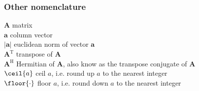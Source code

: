\subsubsection*{Other nomenclature}


$\bm{A}$ \mytab matrix\\

$\bm{a}$ \mytab column vector\\

$|\bm{a}|$ \mytab euclidean norm of vector $\bm{a}$\\

$\bm{A}^\text{T}$ \mytab transpose of $\bm{A}$\\
$\bm{A}^\text{H}$ \mytab Hermitian of $\bm{A}$, also know as the transpose conjugate of $\bm{A}$\\

$\ceil{a}$ \mytab ceil $a$, i.e. round up $a$ to the nearest integer\\

$\floor{\cdot}$ \mytab floor $a$, i.e. round down $a$ to the nearest integer \\








\clearpage
\thispagestyle{empty}


\cleardoublepage
 \setcounter{page}{1}
\baselineskip 18pt